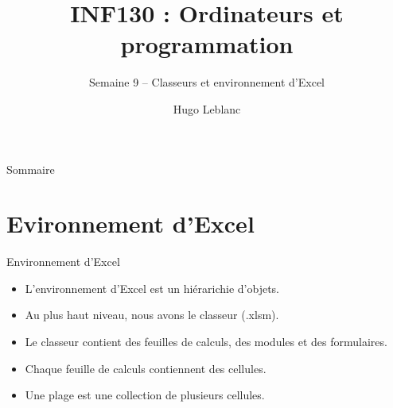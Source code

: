 \documentclass[aspectratio=169,usenames,dvipsnames]{beamer}
\title{INF130 : Ordinateurs et programmation}
\subtitle{Semaine 9 – Classeurs et environnement d'Excel}
\author{Hugo Leblanc}
\begin{document}
    \maketitle

    \begin{frame}{Sommaire}
        \tableofcontents
    \end{frame}

    \section{Evironnement d'Excel}
    \begin{frame}{Environnement d’Excel}
        \begin{itemize}
            \item L’environnement d’Excel est un hiérarichie d’objets.
            \item Au plus haut niveau, nous avons le classeur (.xlsm).
            \item Le classeur contient des feuilles de calculs, des modules et des formulaires.
            \item Chaque feuille de calculs contiennent des cellules.
            \item Une plage est une collection de plusieurs cellules.
        \end{itemize}
    \end{frame}
\end{document}
